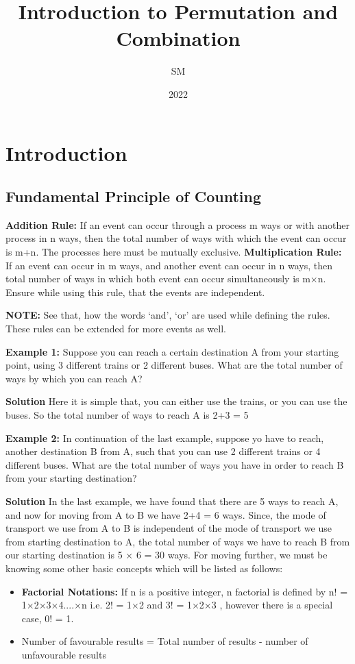 \documentclass[12pt, a4paper]{article}
\title{Introduction to Permutation and Combination}
\author{SM}
\date{2022}
\begin{document}
\maketitle
\newpage
\tableofcontents
\newpage

\section{Introduction}
\subsection{Fundamental Principle of Counting}
\begin{tcolorbox}[colback=TealBlue!10!White,colframe=TealBlue!50!black]
\textbf{Addition Rule:} If an event can occur through a process m ways or with another process in n ways, then the total number of ways with which the event can occur is m+n. The processes here must be mutually exclusive.\newline
\textbf{Multiplication Rule:} If an event can occur in m ways, and another event can occur in n ways, then total number of ways in which both event can occur simultaneously is m×n. Ensure while using this rule, that the events are independent.
\end{tcolorbox}
\textbf{NOTE:} See that, how the words `and', `or' are used while defining the rules. These rules can be extended for more events as well.\newline

\textbf{Example 1:} Suppose you can reach a certain destination A from your starting point, using 3 different trains or 2 different buses. What are the total number of ways by which you can reach A?

\textbf{Solution} Here it is simple that, you can either use the trains, or you can use the buses. So the total number of ways to reach A is 2+3 = 5

\textbf{Example 2:} In continuation of the last example, suppose yo have to reach, another destination B from A, such that you can use 2 different trains or 4 different buses. What are the total number of ways you have in order to reach B from your starting destination?

\textbf{Solution} In the last example, we have found that there are 5 ways to reach A, and now for moving from A to B we have 2+4 = 6 ways. Since, the mode of transport we use from A to B is independent of the mode of transport we use from starting destination to A, the total number of ways we have to reach B from our starting destination is 5 × 6 = 30 ways.\newline \newline 
For moving further, we must be knowing some other basic concepts which will be listed as follows:
\begin{itemize}
    \item \textbf{Factorial Notations:} If n is a positive integer, n factorial is defined by n! = 1×2×3×4....×n i.e. 2! = 1×2 and 3! = 1×2×3 , however there is a special case, 0! = 1.
    \item Number of favourable results = Total number of results - number of unfavourable results
\end{itemize}
\end{document}
